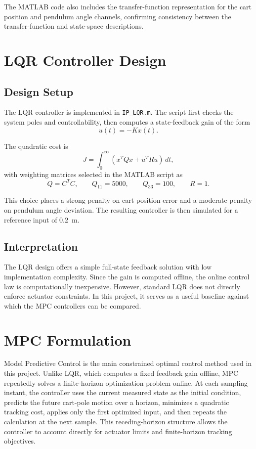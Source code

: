 \documentclass[conference]{IEEEtran}
\begin{document}
The MATLAB code also includes the transfer-function representation for the cart position and pendulum angle channels, confirming consistency between the transfer-function and state-space descriptions.

\section{LQR Controller Design}
\subsection{Design Setup}
The LQR controller is implemented in \texttt{IP\_LQR.m}. The script first checks the system poles and controllability, then computes a state-feedback gain of the form
\[
u(t) = -Kx(t).
\]

The quadratic cost is
\[
J = \int_0^\infty \left(x^TQx + u^TRu\right)\,dt,
\]
with weighting matrices selected in the MATLAB script as
\[
Q = C^T C, \qquad Q_{11}=5000, \qquad Q_{33}=100, \qquad R=1.
\]

This choice places a strong penalty on cart position error and a moderate penalty on pendulum angle deviation. The resulting controller is then simulated for a reference input of $0.2$~m.

\subsection{Interpretation}
The LQR design offers a simple full-state feedback solution with low implementation complexity. Since the gain is computed offline, the online control law is computationally inexpensive. However, standard LQR does not directly enforce actuator constraints. In this project, it serves as a useful baseline against which the MPC controllers can be compared.

\section{MPC Formulation}
Model Predictive Control is the main constrained optimal control method used in this project. Unlike LQR, which computes a fixed feedback gain offline, MPC repeatedly solves a finite-horizon optimization problem online. At each sampling instant, the controller uses the current measured state as the initial condition, predicts the future cart-pole motion over a horizon, minimizes a quadratic tracking cost, applies only the first optimized input, and then repeats the calculation at the next sample. This receding-horizon structure allows the controller to account directly for actuator limits and finite-horizon tracking objectives.
\end{document}
